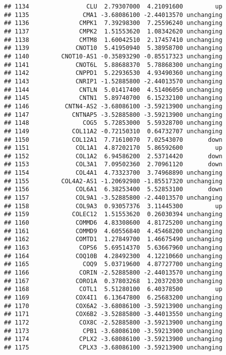 \documentclass[]{article}
\begin{document}
\begin{verbatim}
## 1134                CLU  2.79307000  4.21091600         up
## 1135               CMA1 -3.68086100 -2.44013570 unchanging
## 1136              CMPK1  7.39298300  7.25596240 unchanging
## 1137              CMPK2  1.51553620  1.08342620 unchanging
## 1138              CMTM8  1.60042510  2.17457410 unchanging
## 1139             CNOT10  5.41950940  5.38958700 unchanging
## 1140         CNOT10-AS1 -0.35893290 -0.85517323 unchanging
## 1141             CNOT6L  5.88688370  5.78868300 unchanging
## 1142             CNPPD1  5.22936530  4.93490360 unchanging
## 1143             CNRIP1 -1.52885800 -2.44013570 unchanging
## 1144              CNTLN  5.01417400  4.51406050 unchanging
## 1145              CNTN1  5.89740700  6.15232100 unchanging
## 1146          CNTN4-AS2 -3.68086100 -3.59213900 unchanging
## 1147            CNTNAP5 -3.52885800 -3.59213900 unchanging
## 1148               COG5  5.72853000  5.59328700 unchanging
## 1149            COL11A2 -0.72150310  0.64732707 unchanging
## 1150            COL12A1  7.71610070  7.02543070       down
## 1151             COL1A1  4.87202170  5.86592600         up
## 1152             COL1A2  6.94586200  2.53714420       down
## 1153             COL3A1  7.09502360  2.70961120       down
## 1154             COL4A1  4.73323700  3.74968890 unchanging
## 1155         COL4A2-AS1 -1.20692980 -1.85517320 unchanging
## 1156             COL6A1  6.38253400  5.52853100       down
## 1157             COL9A1 -3.52885800 -2.44013570 unchanging
## 1158             COL9A3  0.93057376  3.11445300         up
## 1159            COLEC12  1.51553620  0.26030394 unchanging
## 1160             COMMD6  4.83308600  4.81725200 unchanging
## 1161             COMMD9  4.60556840  4.45468200 unchanging
## 1162             COMTD1  1.27849700  1.46675490 unchanging
## 1163              COPS6  5.69514370  5.63667960 unchanging
## 1164             COQ10B  4.28492300  4.12210660 unchanging
## 1165               COQ9  5.03719600  4.87727700 unchanging
## 1166              CORIN -2.52885800 -2.44013570 unchanging
## 1167             CORO1A  0.37803268  1.20372030 unchanging
## 1168              COTL1  5.51280100  6.40378500         up
## 1169             COX4I1  6.13647800  6.25683200 unchanging
## 1170             COX6A2 -3.68086100 -3.59213900 unchanging
## 1171             COX6B2 -3.52885800 -3.44013550 unchanging
## 1172              COX8C -2.52885800 -3.59213900 unchanging
## 1173               CPB1 -3.68086100 -3.59213900 unchanging
## 1174              CPLX2 -3.68086100 -3.59213900 unchanging
## 1175              CPLX3 -3.68086100 -3.59213900 unchanging

\end{verbatim}
\end{document}
